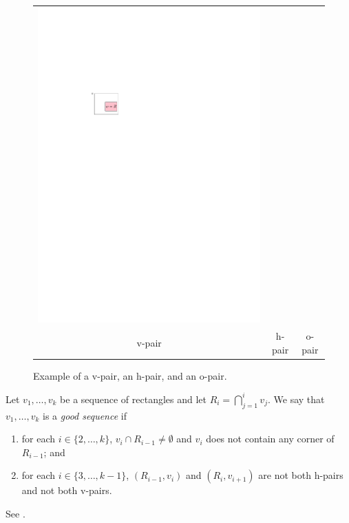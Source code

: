 \documentclass[lotsofwhite]{patmorin}
\begin{document}
\begin{figure}
\begin{tabular}{ccc}
   \includegraphics{figs/hvo-3} \\
   v-pair & h-pair & o-pair
   \end{tabular}
   \caption{Example of a v-pair, an h-pair, and an o-pair.}
\end{figure}

Let $v_1,\ldots,v_k$ be a sequence of rectangles and let
$R_i=\bigcap_{j=1}^i v_j$.  We say that $v_1,\ldots,v_k$ is a \emph{good
sequence} if
\begin{enumerate}
  \item for each $i\in\{2,\ldots,k\}$, $v_i\cap R_{i-1}\neq \emptyset$
        and $v_i$ does not contain any corner of $R_{i-1}$; and
  \item for each $i\in\{3,\ldots,k-1\}$, $(R_{i-1},v_i)$ and
        $(R_i,v_{i+1})$ are not both h-pairs and not both v-pairs.
\end{enumerate}
See .
\end{document}
